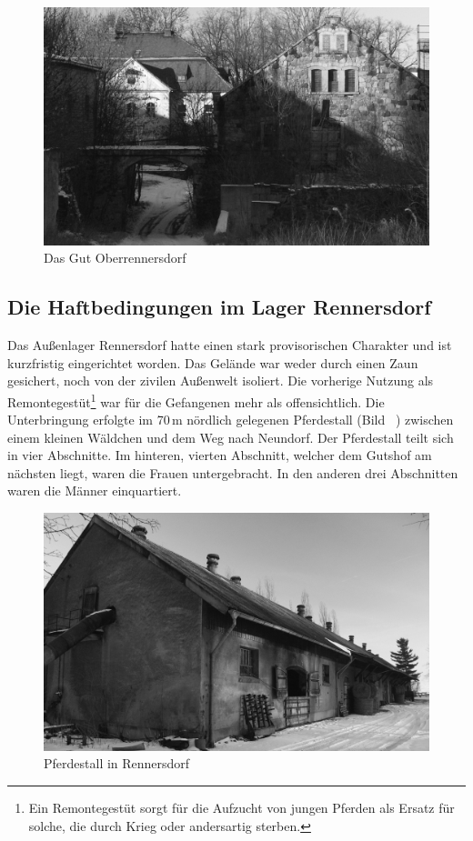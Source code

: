 \begin{figure}[htb]
    \includegraphics[width=\linewidth]{images/renn01}
    \caption[Gut Oberennersdorf]{Das Gut Oberrennersdorf}
    \label{gutoberrennersdorf}
\end{figure}



\subsection{Die Haftbedingungen im Lager Rennersdorf}
Das Außenlager Rennersdorf hatte einen stark provisorischen Charakter und ist kurzfristig eingerichtet worden. Das Gelände war weder durch
einen Zaun gesichert, noch von der zivilen Außenwelt isoliert. Die vorherige Nutzung als Remontegestüt\footnote{Ein Remontegestüt sorgt für die Aufzucht von jungen Pferden als Ersatz für solche, die durch Krieg oder andersartig sterben.} war für die Gefangenen mehr als offensichtlich. Die Unterbringung erfolgte im 70\,m nördlich gelegenen Pferdestall (Bild ~) zwischen einem kleinen Wäldchen und dem Weg nach Neundorf.
Der Pferdestall teilt sich in vier Abschnitte. Im hinteren, vierten Abschnitt, welcher dem Gutshof am nächsten liegt, waren die Frauen untergebracht. In den anderen drei Abschnitten waren die Männer einquartiert.


\begin{figure}[htb]
    \includegraphics[width=\linewidth]{images/renn03}
    \caption[Der Pferdestall]{Pferdestall in Rennersdorf}
    \label{pferdestallfoto}
\end{figure}


